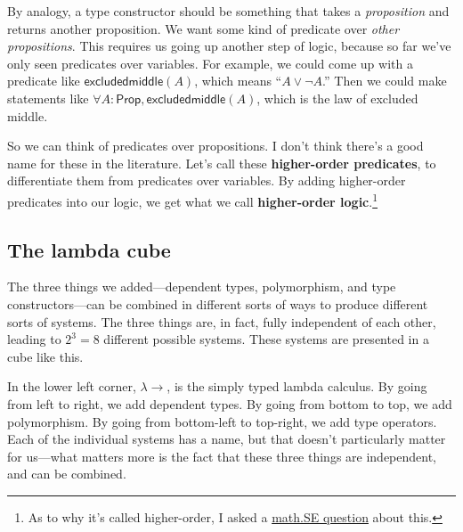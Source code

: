 \documentclass[11pt,paper=letter]{scrartcl}
\renewcommand{\sf}{\mathsf}
\renewcommand{\lor}{\vee}
\renewcommand{\lnot}{\neg}
\newcommand{\prop}{\mathsf{Prop}}
\begin{document}
By analogy, a type constructor should be something that takes a \emph{proposition} and returns another proposition. We want some kind of predicate over \emph{other propositions}. This requires us going up another step of logic, because so far we've only seen predicates over variables. For example, we could come up with a predicate like $\sf{excludedmiddle}(A)$, which means ``$A \lor \lnot A$.'' Then we could make statements like $\forall A: \prop, \sf{excludedmiddle}(A)$, which is the law of excluded middle.

So we can think of predicates over propositions. I don't think there's a good name for these in the literature. Let's call these \textbf{higher-order predicates}, to differentiate them from predicates over variables. By adding higher-order predicates into our logic, we get what we call \textbf{higher-order logic}.\footnote{As to why it's called higher-order, I asked a \href{https://math.stackexchange.com/questions/4232108}{math.SE question} about this.} 

\subsection{The lambda cube}

The three things we added---dependent types, polymorphism, and type constructors---can be combined in different sorts of ways to produce different sorts of systems. The three things are, in fact, fully independent of each other, leading to $2^3 = 8$ different possible systems. These systems are presented in a cube like this.

\begin{center}
\end{center}

In the lower left corner, $\lambda \to$, is the simply typed lambda calculus. By going from left to right, we add dependent types. By going from bottom to top, we add polymorphism. By going from bottom-left to top-right, we add type operators. Each of the individual systems has a name, but that doesn't particularly matter for us---what matters more is the fact that these three things are independent, and can be combined.
\end{document}
